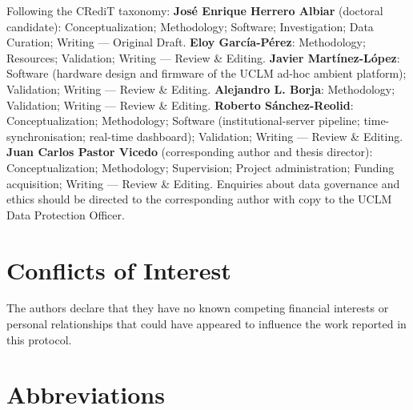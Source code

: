 Following the CRediT taxonomy: \textbf{José Enrique Herrero Albiar} (doctoral candidate): Conceptualization; Methodology; Software; Investigation; Data Curation; Writing --- Original Draft. \textbf{Eloy García-Pérez}: Methodology; Resources; Validation; Writing --- Review \& Editing. \textbf{Javier Martínez-López}: Software (hardware design and firmware of the UCLM ad-hoc ambient platform); Validation; Writing --- Review \& Editing. \textbf{Alejandro L. Borja}: Methodology; Validation; Writing --- Review \& Editing. \textbf{Roberto Sánchez-Reolid}: Conceptualization; Methodology; Software (institutional-server pipeline; time-synchronisation; real-time dashboard); Validation; Writing --- Review \& Editing. \textbf{Juan Carlos Pastor Vicedo} (corresponding author and thesis director): Conceptualization; Methodology; Supervision; Project administration; Funding acquisition; Writing --- Review \& Editing. Enquiries about data governance and ethics should be directed to the corresponding author with copy to the UCLM Data Protection Officer.

\section*{Conflicts of Interest}\label{sec:competing-interests}

The authors declare that they have no known competing financial interests or personal relationships that could have appeared to influence the work reported in this protocol.

\section*{Abbreviations}

